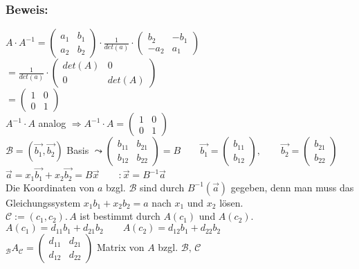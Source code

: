 \subsubsection{Beweis:}
$A\cdot A^{-1} = \begin{pmatrix}a_{1} & b_{1} \\ a_{2} & b_{2} \end{pmatrix} \cdot \frac{1}{det(a)} \cdot \begin{pmatrix} b_{2} & -b_{1} \\ -a_{2} & a_{1} \end{pmatrix}$\\
$ = \frac{1}{det(a)} \cdot \begin{pmatrix} det(A) & 0 \\ 0 & det(A) \end{pmatrix}$\\
$= \begin{pmatrix} 1 & 0 \\ 0 & 1 \end{pmatrix}$\\
$A^{-1}\cdot A$ analog $\Rightarrow A^{-1} \cdot A = \begin{pmatrix} 1 & 0 \\ 0 & 1 \end{pmatrix}$ \\
$\mathcal{B} = (\vec{b_{1}}, \vec{b_{2}})$ Basis $ \leadsto \begin{pmatrix} b_{11} & b_{21} \\ b_{12} & b_{22} \end{pmatrix} = B \qquad \vec{b_{1}} = \begin{pmatrix} b_{11} \\ b_{12} \end{pmatrix}, \qquad \vec{b_{2}}=\begin{pmatrix} b_{21} \\ b_{22} \end{pmatrix}$\\
$\vec{a} = x_{1}\vec{b_{1}} + x_{2}\vec{b_{2}} = B\vec{x}  \qquad  :\vec{x} = B^{-1}\vec{a}$\\
Die Koordinaten von $a$ bzgl. $\mathcal{B}$ sind durch $B^{-1}(\vec{a})$ gegeben, denn man muss das Gleichungssystem $x_{1}b_{1}+x_{2}b_{2}=a$ nach $x_{1}$ und $x_{2}$ lösen. \\
$\mathcal{C} := ( c_{1}, c_{2}). \, A$ ist bestimmt durch $A(c_{1})$ und $A(c_{2})$. \\
$A(c_{1}) = d_{11}b_{1}+d_{21}b_{2} \qquad A(c_{2})=d_{12}b_{1}+d_{22}b_{2}$\\
$_{\mathcal{B}}A_{\mathcal{C}} = \begin{pmatrix}d_{11} & d_{21} \\ d_{12} & d_{22} \end{pmatrix}$ Matrix von $A$ bzgl. $\mathcal{B},\, \mathcal{C}$\\
%
%
%
